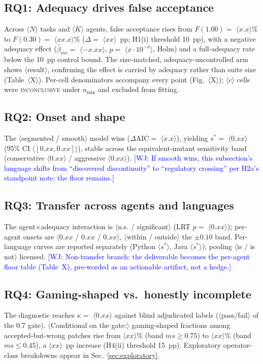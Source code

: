 \documentclass[conference]{IEEEtran}
\newcommand{\PH}[1]{\colorbox{gray!18}{\small$\langle$#1$\rangle$}}
\newcommand{\wj}[1]{\textcolor{blue}{\footnotesize [WJ: #1]}}
\newcommand{\ms}{\ensuremath{\mathit{ms}}}
\begin{document}
\subsection{RQ1: Adequacy drives false acceptance}
Across \PH{$N$} tasks and \PH{$K$} agents, false acceptance rises from
$F(1.00) = $ \PH{$x.x$}\% to $F(0.30) = $ \PH{$xx.x$}\%
($\Delta = $ \PH{$xx$}~pp; H1(i) threshold 10~pp), with a negative
adequacy effect ($\hat\beta_{\ms} = $ \PH{$-x.xx$}, $p = $
\PH{$x{\cdot}10^{-x}$}, Holm) and a full-adequacy rate below the
10~pp control bound. The size-matched, adequacy-uncontrolled arm shows
\PH{result}, confirming the effect is carried by adequacy rather than
suite size (Table~\PH{X}). Per-cell denominators accompany every point
(Fig.~\PH{X}); \PH{$c$} cells were \textsc{inconclusive} under
$n_{\min}$ and excluded from fitting.

\subsection{RQ2: Onset and shape}
The \PH{segmented / smooth} model wins
($\Delta\mathrm{AIC} = $ \PH{$x.x$}), yielding
$s^\ast = $ \PH{$0.xx$} (95\% CI \PH{$[0.xx, 0.xx]$}), stable across the
equivalent-mutant sensitivity band
(conservative \PH{$0.xx$} / aggressive \PH{$0.xx$}).
\wj{If smooth wins, this subsection's language shifts from
``discovered discontinuity'' to ``regulatory crossing'' per H2a's
standpoint note; the floor remains.}

\subsection{RQ3: Transfer across agents and languages}
The agent$\times$adequacy interaction is \PH{n.s. / significant}
(LRT $p = $ \PH{$0.xx$}); per-agent onsets are
\PH{$0.xx$ / $0.xx$ / $0.xx$}, \PH{within / outside} the $\pm 0.10$
band. Per-language curves are reported separately
(Python \PH{$s^\ast$}, Java \PH{$s^\ast$}); pooling \PH{is / is not}
licensed. \wj{Non-transfer branch: the deliverable becomes the
per-agent floor table (Table~X), pre-worded as an actionable artifact,
not a hedge.}

\subsection{RQ4: Gaming-shaped vs.\ honestly incomplete}
The diagnostic reaches $\kappa = $ \PH{$0.xx$} against blind adjudicated
labels (\PH{pass/fail} of the 0.7 gate). \PH{Conditional on the gate:}
gaming-shaped fractions among accepted-but-wrong patches rise from
\PH{$xx$}\% (band $\ms \ge 0.75$) to \PH{$xx$}\%
(band $\ms \le 0.45$), a \PH{$xx$}~pp increase (H4(ii) threshold
15~pp). Exploratory operator-class breakdowns appear in
Sec.~\ref{sec:exploratory}.
\end{document}
